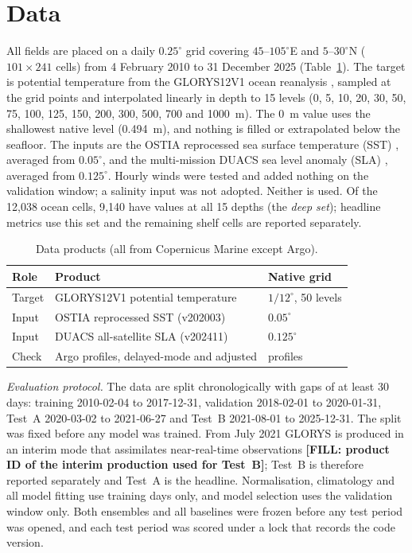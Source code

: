 
\section{Data}
\label{sec:data}
All fields are placed on a daily $0.25^\circ$ grid covering $45$--$105^\circ$E and $5$--$30^\circ$N ($101\times241$ cells) from 4 February 2010 to 31 December 2025 (Table~\ref{tab:data}). The target is potential temperature from the GLORYS12V1 ocean reanalysis \cite{glorys12}, sampled at the grid points and interpolated linearly in depth to 15 levels (0, 5, 10, 20, 30, 50, 75, 100, 125, 150, 200, 300, 500, 700 and 1000~m). The 0~m value uses the shallowest native level (0.494~m), and nothing is filled or extrapolated below the seafloor. The inputs are the OSTIA reprocessed sea surface temperature (SST) \cite{ostia}, averaged from $0.05^\circ$, and the multi-mission DUACS sea level anomaly (SLA) \cite{duacs}, averaged from $0.125^\circ$. Hourly winds were tested and added nothing on the validation window; a salinity input was not adopted. Neither is used. Of the 12{,}038 ocean cells, 9{,}140 have values at all 15 depths (the \emph{deep set}); headline metrics use this set and the remaining shelf cells are reported separately.

\begin{table}[t]
\centering
\caption{Data products (all from Copernicus Marine except Argo).}
\label{tab:data}
\begin{tabular}{@{}lll@{}}
\hline
Role & Product & Native grid \\
\hline
Target & GLORYS12V1 potential temperature & $1/12^\circ$, 50 levels \\
Input & OSTIA reprocessed SST (v202003) & $0.05^\circ$ \\
Input & DUACS all-satellite SLA (v202411) & $0.125^\circ$ \\
Check & Argo profiles, delayed-mode and adjusted & profiles \\
\hline
\end{tabular}
\end{table}

\emph{Evaluation protocol.} The data are split chronologically with gaps of at least 30 days: training 2010-02-04 to 2017-12-31, validation 2018-02-01 to 2020-01-31, Test~A 2020-03-02 to 2021-06-27 and Test~B 2021-08-01 to 2025-12-31. The split was fixed before any model was trained. From July 2021 GLORYS is produced in an interim mode that assimilates near-real-time observations \textbf{[FILL: product ID of the interim production used for Test~B]}; Test~B is therefore reported separately and Test~A is the headline. Normalisation, climatology and all model fitting use training days only, and model selection uses the validation window only. Both ensembles and all baselines were frozen before any test period was opened, and each test period was scored under a lock that records the code version.

